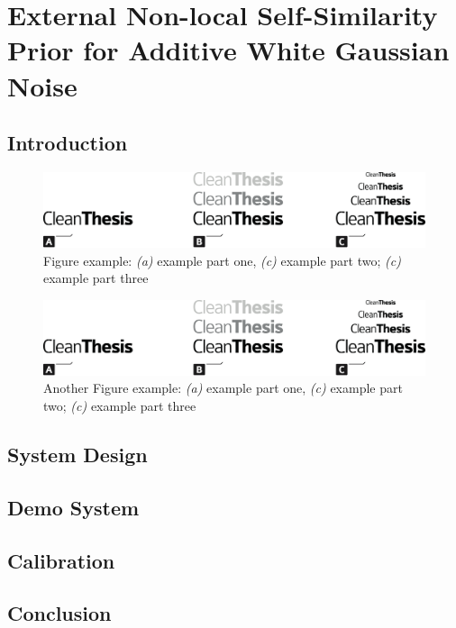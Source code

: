 %
\chapter{External Non-local Self-Similarity Prior for Additive White Gaussian Noise}
\label{sec:system}




\section{Introduction}
\label{sec:system:intro}

\begin{figure}[htb]
	\includegraphics[width=\textwidth]{gfx/Clean-Thesis-Figure}
	\caption{Figure example: \textit{(a)} example part one, \textit{(c)} example part two; \textit{(c)} example part three}
	\label{fig:system:example1}
\end{figure}

\blindtext

\blindtext

\begin{figure}[htb]
	\includegraphics[width=\textwidth]{gfx/Clean-Thesis-Figure}
	\caption{Another Figure example: \textit{(a)} example part one, \textit{(c)} example part two; \textit{(c)} example part three}
	\label{fig:system:example2}
\end{figure}

\blindtext

\section{System Design}
\label{sec:system:design}

\blindtext

\section{Demo System}
\label{sec:system:Demo}

\blindtext

\section{Calibration}
\label{sec:system:calibration}

\blindtext

\section{Conclusion}
\label{sec:system:conclusion}

\blindtext
